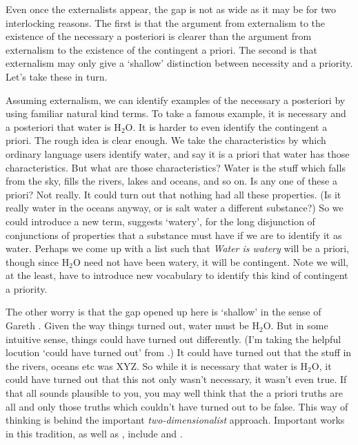 Even once the externalists appear, the gap is not as wide as it may be for two interlocking reasons. The first is that the argument from externalism to the existence of the necessary a posteriori is clearer than the argument from externalism to the existence of the contingent a priori. The second is that externalism may only give a `shallow' distinction between necessity and a priority. Let's take these in turn.

Assuming externalism, we can identify examples of the necessary a posteriori by using familiar natural kind terms. To take a famous example, it is necessary and a posteriori that water is H$_2$O. It is harder to even identify the contingent a priori. The rough idea is clear enough. We take the characteristics by which ordinary language users identify water, and say it is a priori that water has those characteristics. But what are those characteristics? Water is the stuff which falls from the sky, fills the rivers, lakes and oceans, and so on. Is any one of these a priori? Not really. It could turn out that nothing had all these properties. (Is it really water in the oceans anyway, or is salt water a different substance?) So we could introduce a new term,  \citet{Chalmers1996} suggests `watery', for the long disjunction of conjunctions of properties that a substance must have if we are to identify it as water. Perhaps we come up with a list such that \emph{Water is watery} will be a priori, though since H$_2$O need not have been watery, it will be contingent. Note we will, at the least, have to introduce new vocabulary to identify this kind of contingent a priority.

The other worry is that the gap opened up here is `shallow' in the sense of Gareth  \citet{Evans1979}. Given the way things turned out, water must be H$_2$O. But in some intuitive sense, things could have turned out differently. (I'm taking the helpful locution `could have turned out' from  \citet{Yablo2002}.) It could have turned out that the stuff in the rivers, oceans etc was XYZ. So while it is necessary that water is H$_2$O, it could have turned out that this not only wasn't necessary, it wasn't even true. If that all sounds plausible to you, you may well think that the a priori truths are all and only those truths which couldn't have turned out to be false. This way of thinking is behind the important \emph{two-dimensionalist} approach. Important works in this tradition, as well as  \citet{Evans1979}, include  \citet{Davies1980, Chalmers1996} and  \citet{Jackson1998}. 

